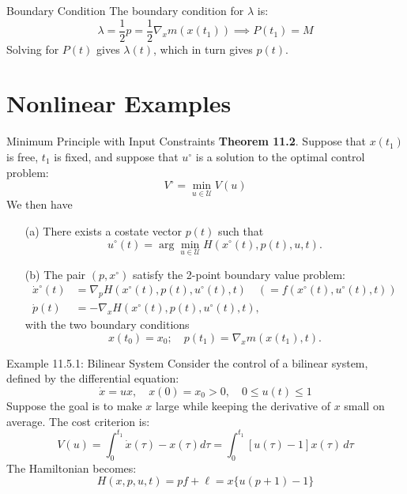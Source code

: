 \documentclass[10pt]{beamer}
\begin{document}
\begin{frame}[fragile]{Boundary Condition}
  The boundary condition for \( \lambda \) is:
  \[
  \lambda = \frac{1}{2} p = \frac{1}{2} \nabla_x m(x(t_1)) \implies P(t_1) = M
  \]
  Solving for \( P(t) \) gives \( \lambda(t) \), which in turn gives \( p(t) \).
\end{frame}

\section{Nonlinear Examples}

\begin{frame}[fragile]{Minimum Principle with Input Constraints}
  \textbf{Theorem 11.2}. Suppose that \( x(t_1) \) is free, \( t_1 \) is fixed, and suppose that \( u^\circ \) is a solution to the optimal control problem: 
  \[
    V^\circ = \min_{u \in \mathcal{U}} V(u)
  \]
  We then have
  \begin{itemize}
      \item[(a)] There exists a costate vector \( p(t) \) such that
      \[
        u^\circ (t) = \arg \min_{u \in \mathcal{U}} H(x^\circ (t), p(t), u, t).
      \]
  
      \item[(b)] The pair \( (p, x^\circ) \) satisfy the 2-point boundary value problem:
      \begin{align*}
        \dot{x}^\circ(t) &= \nabla_p H(x^\circ(t), p(t), u^\circ(t), t) \quad \left( = f(x^\circ(t), u^\circ(t), t) \right) \\
        \dot{p}(t) &= -\nabla_x H(x^\circ(t), p(t), u^\circ(t), t),
      \end{align*}
      with the two boundary conditions
      \[
        x(t_0) = x_0; \quad p(t_1) = \nabla_x m(x(t_1), t).
      \]
  \end{itemize}
\end{frame}
  
\begin{frame}[fragile]{Example 11.5.1: Bilinear System}
  Consider the control of a bilinear system, defined by the differential equation:
  \[
  \dot{x} = ux, \quad x(0) = x_0 > 0, \quad 0 \le u(t) \le 1
  \]
  Suppose the goal is to make \( x \) large while keeping the derivative of \( x \) small on average. The cost criterion is:
  \[
    V(u) = \int_0^{t_1}\dot{x}(\tau)-x(\tau)d\tau = \int_0^{t_1} [u(\tau) - 1]x(\tau) \, d\tau
  \]
  The Hamiltonian becomes:
  \[
    H(x, p, u, t) = pf+\ell = x \{ u(p + 1) - 1 \}
  \]
\end{frame}
  
\end{document}
